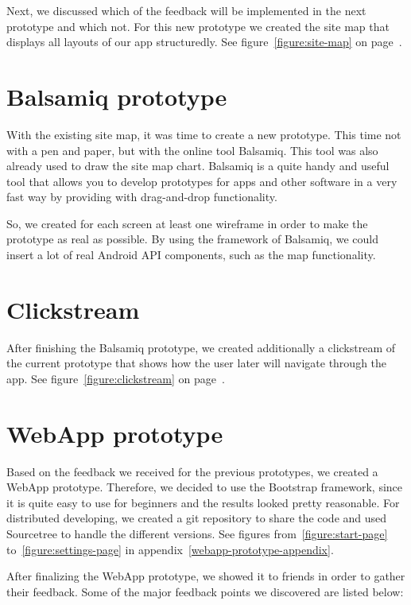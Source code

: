 \documentclass[11pt,twoside,a4paper]{report}
\begin{document}
Next, we discussed which of the feedback will be implemented in the next prototype and which not. For this new prototype we created the site map that displays all layouts of our app structuredly. See figure~\ref{figure:site-map} on page~\pageref{figure:site-map}.

\section{Balsamiq prototype}

With the existing site map, it was time to create a new prototype. This time not with a pen and paper, but with the online tool Balsamiq. This tool was also already used to draw the site map chart. Balsamiq is a quite handy and useful tool that allows you to develop prototypes for apps and other software in a very fast way by providing with drag-and-drop functionality.

So, we created for each screen at least one wireframe in order to make the prototype as real as possible. By using the framework of Balsamiq, we could
insert a lot of real Android API components, such as the map functionality.

\section{Clickstream}

After finishing the Balsamiq prototype, we created additionally a clickstream of the current prototype that shows how the user later will navigate through the app. See figure~\ref{figure:clickstream} on page~\pageref{figure:clickstream}.

\section{WebApp prototype}

Based on the feedback we received for the previous prototypes, we created a WebApp prototype. Therefore, we decided to use the Bootstrap framework, since it is quite easy to use for beginners and the results looked pretty reasonable. For distributed developing, we created a git repository to share the code and used Sourcetree to handle the different versions. See figures from~\ref{figure:start-page} to~\ref{figure:settings-page} in appendix~\ref{webapp-prototype-appendix}.

After finalizing the WebApp prototype, we showed it to friends in order to gather their feedback. Some of the major feedback points we discovered are listed below:
\end{document}

